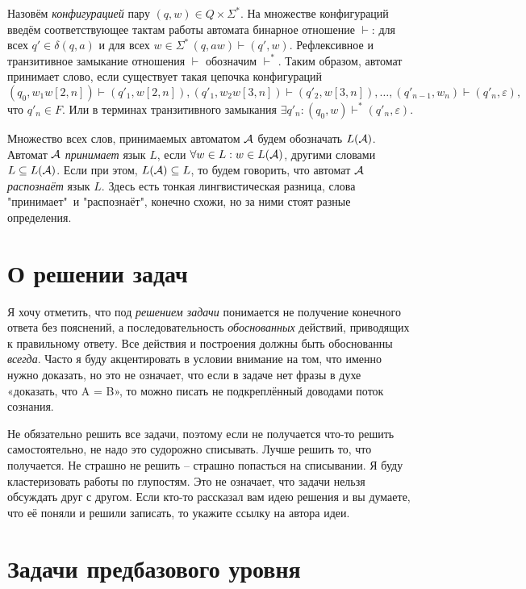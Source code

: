\documentclass[12pt]{article}
\theoremstyle{definiton}
\theoremstyle{definition}
\let\eps\varepsilon
\def\A{{\cal A}}
\begin{document}
	Назовём {\em конфигурацией} пару $(q,w) \in Q \times \Sigma^*$. На множестве конфигураций введём соответствующее тактам работы автомата бинарное отношение $\vdash$:  для всех $q' \in \delta(q,a)$ и для всех $w \in \Sigma^* \, (q,aw) \vdash (q',w)$. Рефлексивное и транзитивное замыкание отношения $\vdash$ обозначим $\vdash^*$. Таким образом, автомат принимает слово, если существует такая цепочка конфигураций \[(q_0, w_1w[2,n]) \vdash (q'_1, w[2,n]), (q'_1, w_2w[3,n]) \vdash (q'_2, w[3,n]),\ldots, (q'_{n-1},w_n) \vdash (q'_n,\eps), \]
	что $q'_n \in F$. Или в терминах транзитивного замыкания $\exists q'_n: (q_0, w) \vdash^* (q'_n, \eps)$.

	Множество всех слов, принимаемых автоматом $\A$ будем обозначать $L(\A)$. Автомат $\A$  \emph{принимает} язык $L$, если $\forall w \in L : w \in L(\A)  $, другими словами $L \subseteq L(\A)$. Если при этом, $L(\A) \subseteq L$, то будем говорить, что автомат $\A$ \emph{распознаёт} язык $L$. Здесь есть тонкая лингвистическая разница,  слова "принимает"\  и "распознаёт", конечно схожи, но за ними стоят разные определения. 

\section{О решении задач}

	Я хочу отметить, что под \emph{решением задачи} понимается не получение конечного ответа без пояснений, а последовательность \emph{обоснованных} действий, приводящих к правильному ответу. Все действия и построения должны быть обоснованны \emph{всегда}. Часто я буду акцентировать в условии внимание на том, что именно нужно доказать, но это не означает, что если в задаче нет фразы в духе «доказать, что A = B», то можно писать не подкреплённый доводами поток сознания.
	
	
	Не обязательно решить все задачи, поэтому если не получается что-то решить самостоятельно, не надо это судорожно списывать. Лучше решить то, что получается. Не страшно не решить -- страшно попасться на списывании. Я буду кластеризовать работы по глупостям. Это не означает, что задачи нельзя обсуждать друг с другом. Если кто-то рассказал вам идею решения и вы думаете, что её поняли и решили записать, то укажите ссылку на автора идеи.

	\section{Задачи предбазового уровня}
\end{document}
